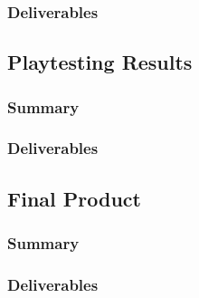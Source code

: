 \subsubsection{Deliverables}

\subsection{Playtesting Results}
\subsubsection{Summary}
\subsubsection{Deliverables}

\subsection{Final Product}
\subsubsection{Summary}
\subsubsection{Deliverables}

\newpage
